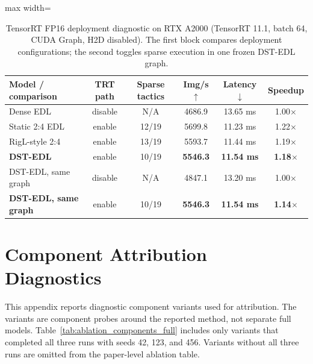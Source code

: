 \documentclass[letterpaper]{article}
\begin{document}
\begin{table}[!t]
\centering
\caption{TensorRT FP16 deployment diagnostic on RTX A2000 (TensorRT 11.1, batch 64, CUDA Graph, H2D disabled). The first block compares deployment configurations; the second toggles sparse execution in one frozen DST-EDL graph.}
\label{tab:hardware_benchmarks}
\scriptsize
\renewcommand{\arraystretch}{1.05}
\setlength{\tabcolsep}{1.2pt}
\begin{adjustbox}{max width=\columnwidth}
\begin{tabular}{@{}l c c c c c@{}}
\toprule
\textbf{Model / comparison} & \textbf{TRT path} & \textbf{Sparse tactics} & \textbf{Img/s} $\uparrow$ & \textbf{Latency} $\downarrow$ & \textbf{Speedup} \\
\midrule
Dense EDL & disable & N/A & 4686.9 & 13.65 ms & 1.00$\times$ \\
Static 2:4 EDL & enable & 12/19 & 5699.8 & 11.23 ms & 1.22$\times$ \\
RigL-style 2:4 & enable & 13/19 & 5593.7 & 11.44 ms & 1.19$\times$ \\
\textbf{DST-EDL} & enable & 10/19 & \textbf{5546.3} & \textbf{11.54 ms} & \textbf{1.18$\times$} \\
\midrule
DST-EDL, same graph & disable & N/A & 4847.1 & 13.20 ms & 1.00$\times$ \\
\textbf{DST-EDL, same graph} & enable & 10/19 & \textbf{5546.3} & \textbf{11.54 ms} & \textbf{1.14$\times$} \\
\bottomrule
\end{tabular}
\end{adjustbox}
\end{table}

\FloatBarrier
\section{Component Attribution Diagnostics}
\label{app:ablation}
This appendix reports diagnostic component variants used for attribution.
The variants are component probes around the reported method, not separate full
models. Table~\ref{tab:ablation_components_full} includes only variants that
completed all three runs with seeds 42, 123, and 456. Variants without all
three runs are omitted from the paper-level ablation table.
\end{document}
